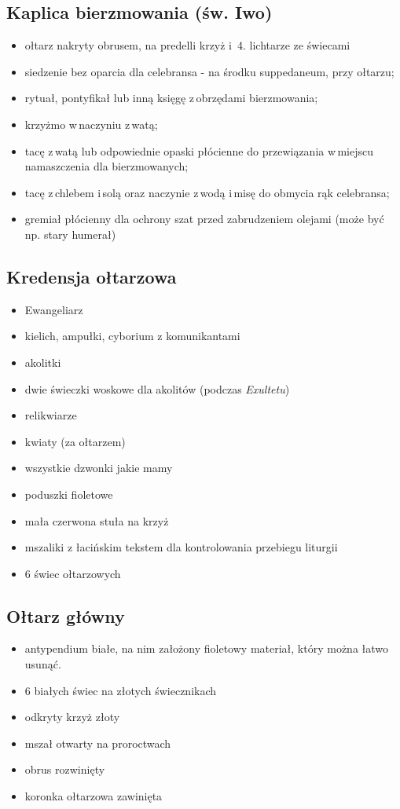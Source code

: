 \subsection{Kaplica bierzmowania (św. Iwo)}
\begin{itemize}
	\item ołtarz nakryty obrusem, na predelli krzyż i  4. lichtarze ze świecami
	\item siedzenie bez oparcia dla celebransa - na środku suppedaneum, przy
	      ołtarzu;
	\item rytuał, pontyfikał lub inną księgę z obrzędami bierzmowania;
	\item krzyżmo w naczyniu z watą;
	\item tacę z watą lub odpowiednie opaski płócienne do przewiązania w miejscu
	      namaszczenia dla bierzmowanych;
	\item tacę z chlebem i solą oraz naczynie z wodą i misę do obmycia rąk
	      celebransa;
	\item gremiał płócienny dla ochrony szat przed zabrudzeniem olejami (może
	      być np. stary humerał)
\end{itemize}

\subsection{Kredensja ołtarzowa}
\begin{itemize}
	\item Ewangeliarz
	\item kielich, ampułki, cyborium z komunikantami
	\item akolitki
	\item dwie świeczki woskowe dla akolitów (podczas \textit{Exultetu})
	\item relikwiarze
	\item kwiaty (za ołtarzem)
	\item wszystkie dzwonki jakie mamy
	\item poduszki fioletowe
	\item mała czerwona stuła na krzyż
	\item mszaliki z łacińskim tekstem dla kontrolowania przebiegu liturgii
	\item 6 świec ołtarzowych 
\end{itemize}

\subsection{Ołtarz główny}
\begin{itemize}
	\item antypendium białe, na nim założony {\color{violet}fioletowy} materiał,
	      który można łatwo usunąć.
	\item 6 białych świec na złotych świecznikach
	\item odkryty krzyż złoty
	\item mszał otwarty na proroctwach
	\item obrus rozwinięty
	\item koronka ołtarzowa zawinięta
\end{itemize}

